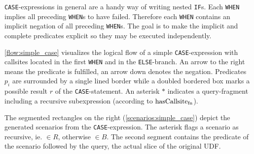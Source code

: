\texttt{CASE}-expressions in general are a handy way of writing nested \texttt{IF}s. Each \texttt{WHEN} implies all preceding \texttt{WHEN}s to have failed. Therefore each \texttt{WHEN} contains an implicit negation of all preceding \texttt{WHEN}s. The goal is to make the implicit and complete predicates explicit so they may be executed independently.

\autoref{flow:simple_case} visualizes the logical flow of a simple \texttt{CASE}-expression with callsites located in the first \texttt{WHEN} and in the \texttt{ELSE}-branch. An arrow to the right means the predicate is fulfilled, an arrow down denotes the negation. Predicates $p_i$ are surrounded by a single lined border while a doubled bordered box marks a possible result $r$ of the \texttt{CASE}-statement. An asterisk $\ast$ indicates a query-fragment including a recursive subexpression (according to $\operatorname{\text{hasCallsite}_{fn}}$).

The segmented rectangles on the right (\autoref{scenarios:simple_case}) depict the generated scenarios from the \texttt{CASE}-expression. The asterisk flags a scenario as recursive, ie. $\in R$, otherwise $\in B$. The second segment contains the predicate of the scenario followed by the query, the actual slice of the original UDF.

